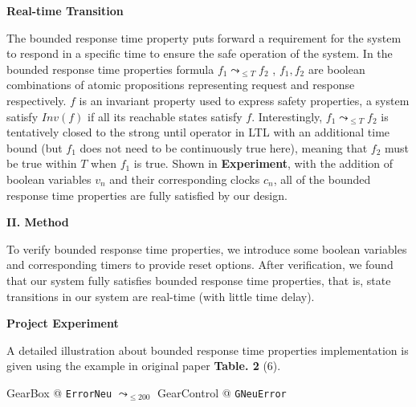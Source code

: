 \documentclass[a4paper]{article}
\begin{document}
\vspace{2mm}
\begin{center}
\large\textbf{Real-time Transition} \\
\end{center}

\large{
The bounded response time property puts forward a requirement for the system to respond in a specific time to ensure the safe operation of the system. In the bounded response time properties formula $f_1 \leadsto_{\le T} f_2$ , $ f_1, f_2$ are boolean combinations of atomic propositions representing request and response respectively. $f$ is an invariant property used to express safety properties, a system satisfy $Inv(f)$ if all its reachable states satisfy $f$. Interestingly, $f_1 \leadsto_{\le T} f_2$ is tentatively closed to the strong until operator in \normalsize{LTL }\large with an additional time bound (but $f_1$ does not need to be continuously true here), meaning that $f_2$ must be true within $T$ when $f_1$ is true. Shown in \normalsize{\textbf{Experiment}}\large, with the addition of boolean variables $v_n$ and their corresponding clocks $c_n$, all of the bounded response time properties are fully satisfied by our design.}


\vspace{5mm}
\begin{center}
\LARGE\textbf{II. Method} \\
\end{center}
\vspace{2mm}




\large{
To verify bounded response time properties, we introduce some boolean variables and corresponding timers to provide reset options. After verification, we found that our system fully satisfies bounded response time properties, that is, state transitions in our system are real-time (with little time delay).}

\vspace{2mm}
\begin{center}
\large\textbf{Project Experiment} \\
\end{center}

\large{
A detailed illustration about bounded response time properties implementation is given using the example in original paper \textbf{Table. 2} (6).}

\begin{center}
\textsf{GearBox} @ \texttt{ErrorNeu} $\leadsto _{\le 200}$ \textsf{GearControl} @ \texttt{GNeuError}
\end{center}
\end{document}
